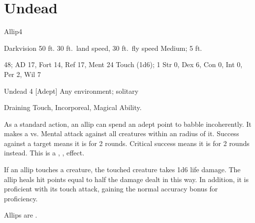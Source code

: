 \section{Undead}

    \begin{monsection}{Allip}{4}
        \begin{spellcontent}
            \begin{spelltargetinginfo}
                \pari {} Darkvision 50 ft.
                \pari {} 30 ft.\ land speed, 30 ft.\ fly speed
                \pari {} Medium;  5 ft.
            \end{spelltargetinginfo}
            \begin{spelleffects}
                \pari {} 48;  AD 17, Fort 14, Ref 17, Ment 24
                \pari {} Touch  (1d6);  1
                \pari {} Str 0, Dex 6, Con 0, Int 0, Per 2, Wil 7
            \end{spelleffects}
        \end{spellcontent}
        \begin{spellfooter}
            \pari {} Undead 4 [Adept]
            \pari {} Any environment; solitary
        \end{spellfooter}
    \end{monsection}
     Draining Touch, Incorporeal, Magical Ability.

     As a standard action, an allip can spend an adept point to babble incoherently.
    It makes a  vs. Mental attack against all creatures within an \areamed radius of it.
    Success against a target means it is \disoriented for 2 rounds.
    Critical success means it is \confused for 2 rounds instead.
    This is a , ,  effect. 

     If an allip touches a creature, the touched creature takes 1d6  life damage.
    The allip heals hit points equal to half the damage dealt in this way.
    In addition, it is proficient with its touch attack, gaining the normal  accuracy bonus for proficiency.

     Allips are .
